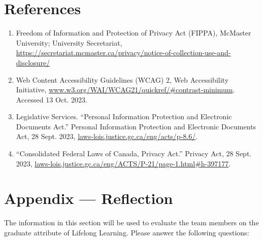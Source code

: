 \documentclass[12pt]{article}
\begin{document}
\newpage{}

\section{References}
\begin{enumerate}
  \item Freedom of Information and Protection of Privacy Act (FIPPA), McMaster University; University Secretariat, \url{https://secretariat.mcmaster.ca/privacy/notice-of-collection-use-and-disclosure/}
  \item Web Content Accessibility Guidelines (WCAG) 2, Web Accessibility Initiative, \url{www.w3.org/WAI/WCAG21/quickref/#contrast-minimum}. Accessed 13 Oct. 2023. 
  \item Legislative Services. “Personal Information Protection and Electronic Documents Act.” Personal Information Protection and Electronic Documents Act, 28 Sept. 2023, \url{laws-lois.justice.gc.ca/eng/acts/p-8.6/}. 
  \item “Consolidated Federal Laws of Canada, Privacy Act.” Privacy Act, 28 Sept. 2023, \url{laws-lois.justice.gc.ca/eng/ACTS/P-21/page-1.html#h-397177}. 
\end{enumerate}

\newpage{}
\section*{Appendix --- Reflection}

The information in this section will be used to evaluate the team members on the
graduate attribute of Lifelong Learning.  Please answer the following questions:
\end{document}
